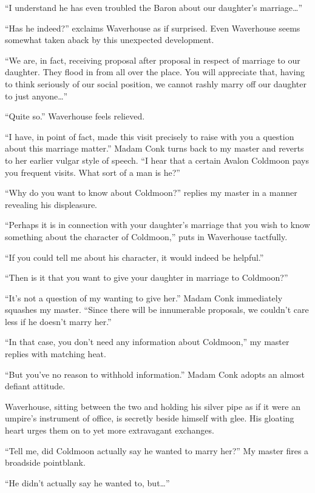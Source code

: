 \documentclass[12pt, openright]{book}
\begin{document}
``I understand he has even troubled the Baron about our daughter's
marriage\ldots{}''

``Has he indeed?'' exclaims Waverhouse as if surprised. Even Waverhouse
seems somewhat taken aback by this unexpected development.

``We are, in fact, receiving proposal after proposal in respect of
marriage to our daughter. They flood in from all over the place. You
will appreciate that, having to think seriously of our social position,
we cannot rashly marry off our daughter to just anyone\ldots{}''

``Quite so.'' Waverhouse feels relieved.

``I have, in point of fact, made this visit precisely to raise with you
a question about this marriage matter.'' Madam Conk turns back to my
master and reverts to her earlier vulgar style of speech. ``I hear that
a certain Avalon Coldmoon pays you frequent visits. What sort of a man
is he?''

``Why do you want to know about Coldmoon?'' replies my master in a
manner revealing his displeasure.

``Perhaps it is in connection with your daughter's marriage that you
wish to know something about the character of Coldmoon,'' puts in
Waverhouse tactfully.

``If you could tell me about his character, it would indeed be
helpful.''

``Then is it that you want to give your daughter in marriage to
Coldmoon?''

``It's not a question of my wanting to give her.'' Madam Conk
immediately squashes my master. ``Since there will be innumerable
proposals, we couldn't care less if he doesn't marry her.''

``In that case, you don't need any information about Coldmoon,'' my
master replies with matching heat.

``But you've no reason to withhold information.'' Madam Conk adopts an
almost defiant attitude.

Waverhouse, sitting between the two and holding his silver pipe as if it
were an umpire's instrument of office, is secretly beside himself with
glee. His gloating heart urges them on to yet more extravagant
exchanges.

``Tell me, did Coldmoon actually say he wanted to marry her?'' My master
fires a broadside pointblank.

``He didn't actually say he wanted to, but\ldots{}''
\end{document}
